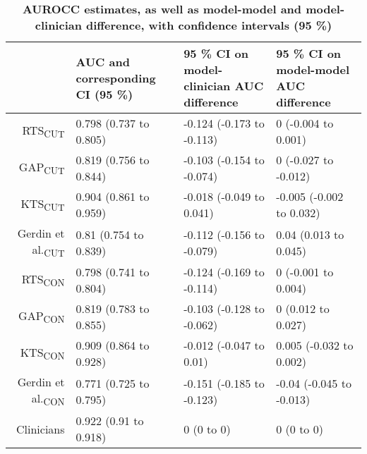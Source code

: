 \begin{table}[!ht]
\centering
\caption{\bf AUROCC estimates, as well as model-model and model-clinician difference, with confidence intervals (95 \%)} 
\label{table:auc}
\begin{adjustbox}{max width = \linewidth} 
\begin{tabular} 
{rlll}
  \toprule
 & AUC and corresponding CI (95 \%) & 95 \% CI on model-clinician AUC difference & 95 \% CI on model-model AUC difference \\ 
  \midrule
RTS\textsubscript{CUT} & 0.798 (0.737 to 0.805) & -0.124 (-0.173 to -0.113) & 0 (-0.004 to 0.001) \\ 
  GAP\textsubscript{CUT} & 0.819 (0.756 to 0.844) & -0.103 (-0.154 to -0.074) & 0 (-0.027 to -0.012) \\ 
  KTS\textsubscript{CUT} & 0.904 (0.861 to 0.959) & -0.018 (-0.049 to 0.041) & -0.005 (-0.002 to 0.032) \\ 
  Gerdin et al.\textsubscript{CUT} & 0.81 (0.754 to 0.839) & -0.112 (-0.156 to -0.079) & 0.04 (0.013 to 0.045) \\ 
  RTS\textsubscript{CON} & 0.798 (0.741 to 0.804) & -0.124 (-0.169 to -0.114) & 0 (-0.001 to 0.004) \\ 
  GAP\textsubscript{CON} & 0.819 (0.783 to 0.855) & -0.103 (-0.128 to -0.062) & 0 (0.012 to 0.027) \\ 
  KTS\textsubscript{CON} & 0.909 (0.864 to 0.928) & -0.012 (-0.047 to 0.01) & 0.005 (-0.032 to 0.002) \\ 
  Gerdin et al.\textsubscript{CON} & 0.771 (0.725 to 0.795) & -0.151 (-0.185 to -0.123) & -0.04 (-0.045 to -0.013) \\ 
  Clinicians & 0.922 (0.91 to 0.918) & 0 (0 to 0) & 0 (0 to 0) \\ 
   \bottomrule
\end{tabular} 
\end{adjustbox}
\end{table}

